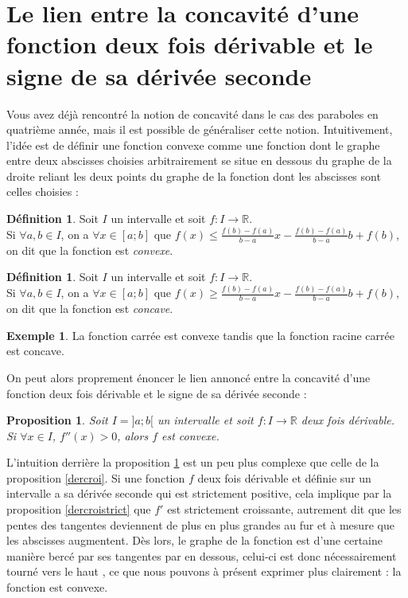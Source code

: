 \documentclass[a4paper,fontsize=13pt]{scrreprt}
\theoremstyle{plain}
\newtheorem{pro}[subsection]{Proposition}
\theoremstyle{definition}
\newtheorem{déf}[subsection]{Définition}
\newtheorem{exe}[subsection]{Exemple}
\newcommand{\rr}{\mathbb{R}}
\begin{document}
\section{Le lien entre la concavité d'une fonction deux fois dérivable et le signe de sa dérivée seconde}
Vous avez déjà rencontré la notion de concavité dans le cas des paraboles en quatrième année, mais il est possible de généraliser cette notion. Intuitivement, l'idée est de définir une fonction convexe comme une fonction dont le graphe entre deux abscisses choisies arbitrairement se situe en dessous du graphe de la droite reliant les deux points du graphe de la fonction dont les abscisses sont celles choisies :
\begin{déf}
Soit $I$ un intervalle et soit $f : I \to \rr$.\\
Si $\forall a,b \in I$, on a $\forall x \in [a;b]$ que $f(x) \le \frac{f(b)-f(a)}{b-a}x - \frac{f(b)-f(a)}{b-a}b + f(b)$, on dit que la fonction est \emph{convexe}.
\end{déf}
\begin{déf}
Soit $I$ un intervalle et soit $f : I \to \rr$.\\
Si $\forall a,b \in I$, on a $\forall x \in [a;b]$ que $f(x) \ge \frac{f(b)-f(a)}{b-a}x - \frac{f(b)-f(a)}{b-a}b + f(b)$, on dit que la fonction est \emph{concave}.
\end{déf}
\begin{exe}
La fonction carrée est convexe tandis que la fonction racine carrée est concave.
\end{exe}
On peut alors proprement énoncer le lien annoncé entre la concavité d'une fonction deux fois dérivable et le signe de sa dérivée seconde :
\begin{pro} \label{derconv}
Soit $I=]a;b[$ un intervalle et soit $f : I \to \rr$ deux fois dérivable.\\
Si $\forall x \in I$, $f''(x) > 0$, alors $f$ est convexe.
\end{pro}
L'intuition derrière la proposition \ref{derconv} est un peu plus complexe que celle de la proposition \ref{dercroi}. Si une fonction $f$ deux fois dérivable et définie sur un intervalle a sa dérivée seconde qui est strictement positive, cela implique par la proposition \ref{dercroistrict} que $f'$ est strictement croissante, autrement dit que les pentes des tangentes deviennent de plus en plus grandes au fur et à mesure que les abscisses augmentent. Dès lors, le graphe de la fonction est d'une certaine manière \og bercé \fg{} par ses tangentes par en dessous, celui-ci est donc nécessairement \og tourné vers le haut \fg{}, ce que nous pouvons à présent exprimer plus clairement : la fonction est convexe.
\end{document}
